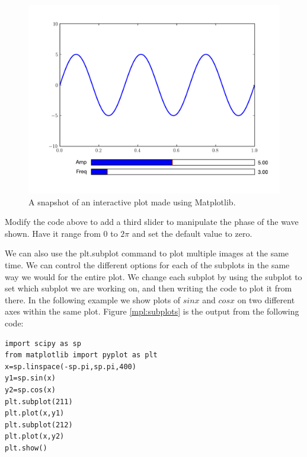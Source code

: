 \begin{figure}
\includegraphics[width=\textwidth]{interact.pdf}
\caption{A snapshot of an interactive plot made using Matplotlib.}
\label{mpl:interact}
\end{figure}

\begin{problem}
Modify the code above to add a third slider to manipulate the phase of the wave shown.
Have it range from 0 to $2\pi$ and set the default value to zero.
\end{problem}

We can also use the plt.subplot command to plot multiple images at the same time.
We can control the different options for each of the subplots in the same way we would for the entire plot.
We change each subplot by using the subplot to set which subplot we are working on, and then writing the code to plot it from there.
In the following example we show plots of $sin x$ and $cos x$ on two different axes within the same plot.
Figure \ref{mpl:subplots} is the output from the following code:
\begin{lstlisting}
import scipy as sp
from matplotlib import pyplot as plt
x=sp.linspace(-sp.pi,sp.pi,400)
y1=sp.sin(x)
y2=sp.cos(x)
plt.subplot(211)
plt.plot(x,y1)
plt.subplot(212)
plt.plot(x,y2)
plt.show()
\end{lstlisting}


